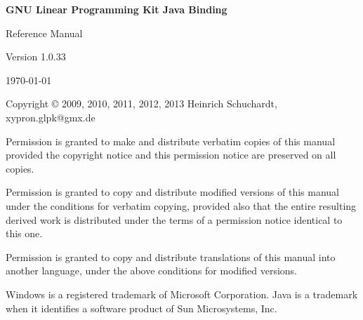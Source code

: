 \documentclass[a4paper,11pt]{report}
\newcommand{\glpkJavaVersion}{1.0.33}
\begin{document}

\thispagestyle{empty}

\begin{center}

\vspace*{1in}

\begin{huge}
\sf\bfseries GNU Linear Programming Kit\linebreak
Java Binding
\end{huge}

\vspace{0.5in}

\begin{LARGE}
\sf Reference Manual
\end{LARGE}

\vspace{0.5in}

\begin{LARGE}
\sf Version \glpkJavaVersion
\end{LARGE}

\vspace{0.5in}
\begin{Large}
\sf \today
\end{Large}
\end{center}

\newpage

\vspace*{1in}

\vfill

\medskip \noindent
Copyright \copyright{} 2009, 2010, 2011, 2012, 2013 Heinrich Schuchardt,
xypron.glpk@gmx.de

\medskip \noindent
Permission is granted to make and distribute verbatim copies of this
manual provided the copyright notice and this permission notice are
preserved on all copies.

\medskip \noindent
Permission is granted to copy and distribute modified versions of this
manual under the conditions for verbatim copying, provided also that the
entire resulting derived work is distributed under the terms of
a permission notice identical to this one.

\medskip \noindent
Permission is granted to copy and distribute translations of this manual
into another language, under the above conditions for modified versions.

\medskip \noindent
Windows is a registered trademark of Microsoft Corporation. Java is a 
trademark when it identifies a software product of Sun Microsystems, Inc.
\end{document}
